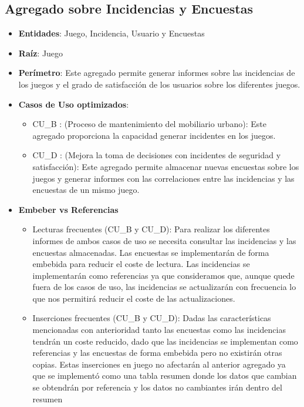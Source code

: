 \documentclass[]{article}
\begin{document}
\subsection{Agregado sobre Incidencias y Encuestas}
\label{sub_sec:agregado_inserciones_encuestas}
\begin{itemize}
    \item \textbf{Entidades}: Juego, Incidencia, Usuario y Encuestas
    \item \textbf{Raíz}: Juego
    \item \textbf{Perímetro}: Este agregado permite generar informes sobre las incidencias de los juegos y el grado de satisfacción de los usuarios sobre los diferentes juegos.
    \item \textbf{Casos de Uso optimizados}:
    \begin{itemize}
        \item CU\_B : (Proceso de mantenimiento del mobiliario urbano): Este agregado proporciona la capacidad generar incidentes en los juegos.
        \item CU\_D : (Mejora la toma de decisiones con incidentes de seguridad y satisfacción): Este agregado permite almacenar nuevas encuestas sobre los juegos y generar informes con las correlaciones entre las incidencias y las encuestas de un mismo juego. 
    \end{itemize}
    \item \textbf{Embeber vs Referencias}
    \begin{itemize}
        \item Lecturas frecuentes (CU\_B y CU\_D): Para realizar los diferentes informes de ambos casos de uso se necesita consultar las incidencias y las encuestas almacenadas. Las encuestas se implementarán de forma embebida para reducir el coste de lectura. Las incidencias se implementarán como referencias ya que consideramos que, aunque quede fuera de los casos de uso, las incidencias se actualizarán con frecuencia lo que nos permitirá reducir el coste de las actualizaciones. 
        \item Inserciones frecuentes (CU\_B y CU\_D): Dadas las características mencionadas con anterioridad tanto las encuestas como las incidencias tendrán un coste reducido, dado que las incidencias se implementan como referencias y las encuestas de forma embebida pero no existirán otras copias. Estas inserciones en juego no afectarán al anterior agregado ya que se implementó como una tabla resumen donde los datos que cambian se obtendrán por referencia y los datos no cambiantes irán dentro del resumen
    \end{itemize}
\end{itemize}
\end{document}
